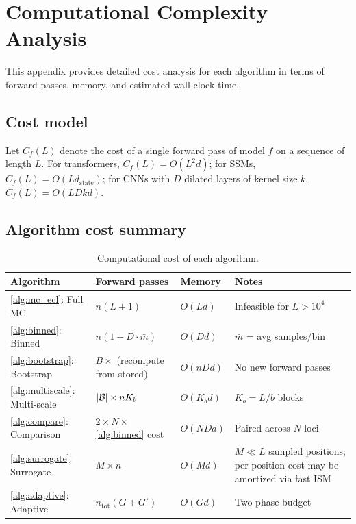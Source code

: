\section{Computational Complexity Analysis}\label{app:complexity}

This appendix provides detailed cost analysis for each algorithm in terms of forward passes, memory, and estimated wall-clock time.

\subsection{Cost model}

Let $C_f(L)$ denote the cost of a single forward pass of model $f$ on a sequence of length $L$. For transformers, $C_f(L) = O(L^2 d)$; for SSMs, $C_f(L) = O(L d_{\mathrm{state}})$; for CNNs with $D$ dilated layers of kernel size $k$, $C_f(L) = O(L D k d)$.

\subsection{Algorithm cost summary}

\begin{table}[H]
\centering
\caption{Computational cost of each algorithm.}
\label{tab:complexity}
\small
\begin{tabular}{@{}l l l l@{}}
\toprule
\textbf{Algorithm} & \textbf{Forward passes} & \textbf{Memory} & \textbf{Notes} \\
\midrule
\ref{alg:mc_ecl}: Full MC & $n(L+1)$ & $O(Ld)$ & Infeasible for $L>10^4$ \\
\ref{alg:binned}: Binned & $n(1 + D \cdot \bar{m})$ & $O(Dd)$ & $\bar{m}$ = avg samples/bin \\
\ref{alg:bootstrap}: Bootstrap & $B \times$ (recompute from stored) & $O(nDd)$ & No new forward passes \\
\ref{alg:multiscale}: Multi-scale & $|\mathcal{B}| \times n K_b$ & $O(K_b d)$ & $K_b = L/b$ blocks \\
\ref{alg:compare}: Comparison & $2 \times N \times$ \ref{alg:binned} cost & $O(NDd)$ & Paired across $N$ loci \\
\ref{alg:surrogate}: Surrogate & $M \times n$ & $O(Md)$ & $M \ll L$ sampled positions; per-position cost may be amortized via fast ISM~\citep{Nair2022fastISM,Schreiber2022Yuzu} \\
\ref{alg:adaptive}: Adaptive & $n_{\mathrm{tot}}(G + G')$ & $O(Gd)$ & Two-phase budget \\
\bottomrule
\end{tabular}
\end{table}

